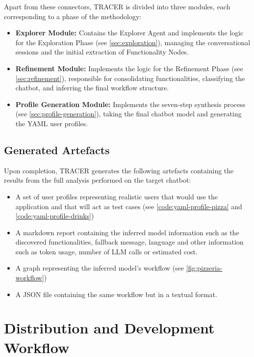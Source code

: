 Apart from these connectors,
\ac{TRACER} is divided into three modules,
each corresponding to a phase of the methodology:

\begin{itemize}
  \item \textbf{Explorer Module:}
    Contains the Explorer Agent
    and implements the logic for the Exploration Phase (see \autoref{sec:exploration}),
    managing the conversational sessions and the initial extraction of Functionality Nodes.

  \item \textbf{Refinement Module:}
    Implements the logic for the Refinement Phase (see \autoref{sec:refinement}),
    responsible for consolidating functionalities,
    classifying the chatbot, and inferring the final workflow structure.

  \item \textbf{Profile Generation Module:}
    Implements the seven-step synthesis process (see \autoref{sec:profile-generation}),
    taking the final chatbot model and generating the YAML user profiles.
\end{itemize}

\subsection{Generated Artefacts}

Upon completion, \ac{TRACER} generates the following artefacts
containing the results from the full analysis performed on the target chatbot:

\begin{itemize}
  \item A set of user profiles
    representing realistic users that would use the application
    and that will act as test cases
    (see \autoref{code:yaml-profile-pizza} and \autoref{code:yaml-profile-drinks})
  \item A markdown report containing the inferred model information such as
    the discovered functionalities, fallback message, language
    and other information such as token usage,
    number of \ac{LLM} calls or estimated cost.
  \item A graph representing the inferred model's workflow (see \autoref{fig:pizzeria-workflow})
  \item A JSON file containing the same workflow but in a textual format.
\end{itemize}



\section{Distribution and Development Workflow}

